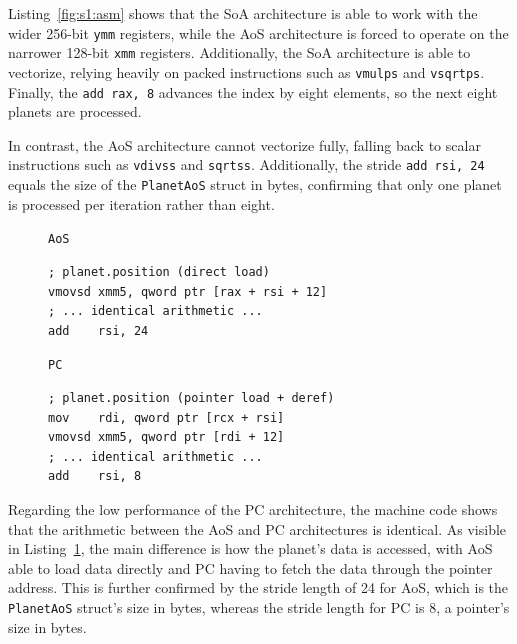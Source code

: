 Listing~\ref{fig:s1:asm} shows that the \ac{SoA} architecture is able to work with the wider \num{256}-bit \texttt{ymm} registers, while the \ac{AoS} architecture is forced to operate on the narrower \num{128}-bit \texttt{xmm} registers. Additionally, the \ac{SoA} architecture is able to vectorize, relying heavily on packed instructions such as \texttt{vmulps} and \texttt{vsqrtps}. Finally, the \texttt{add~rax,~8} advances the index by eight elements, so the next eight planets are processed. 

In contrast, the \ac{AoS} architecture cannot vectorize fully, falling back to scalar instructions such as \texttt{vdivss} and \texttt{sqrtss}. Additionally, the stride \texttt{add~rsi,~24} equals the size of the \texttt{PlanetAoS} struct in bytes, confirming that only one planet is processed per iteration rather than eight.

\begin{figure}[htbp]
\centering
\begin{minipage}[t]{0.42\linewidth}
\centering\texttt{AoS}\par\smallskip
\begin{lstlisting}[language={[x86masm]Assembler}, basicstyle=\scriptsize\ttfamily]
; planet.position (direct load)
vmovsd xmm5, qword ptr [rax + rsi + 12]
; ... identical arithmetic ...
add    rsi, 24
\end{lstlisting}
\end{minipage}%
\hspace{3em}%
\begin{minipage}[t]{0.42\linewidth}
\centering\texttt{PC}\par\smallskip
\begin{lstlisting}[language={[x86masm]Assembler}, basicstyle=\scriptsize\ttfamily]
; planet.position (pointer load + deref)
mov    rdi, qword ptr [rcx + rsi]
vmovsd xmm5, qword ptr [rdi + 12]
; ... identical arithmetic ...
add    rsi, 8
\end{lstlisting}
\end{minipage}
\label{fig:s1:asm:pc}
\end{figure}

Regarding the low performance of the \ac{PC} architecture, the machine code shows that the arithmetic between the \ac{AoS} and \ac{PC} architectures is identical. As visible in Listing~\ref{fig:s1:asm:pc}, the main difference is how the planet's data is accessed, with \ac{AoS} able to load data directly and \ac{PC} having to fetch the data through the pointer address. This is further confirmed by the stride length of \num{24} for \ac{AoS}, which is the \texttt{PlanetAoS} struct's size in bytes, whereas the stride length for \ac{PC} is \num{8}, a pointer's size in bytes.

